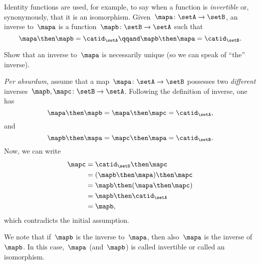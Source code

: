 Identity functions are used, for example, to say when a function is \emph{invertible} or, synonymously, that it is an isomorphism.
Given~$\mapa \colon \setA \to \setB$, an inverse to~$\mapa$ is a function~$\mapb \colon \setB \to \setA$ such that
\begin{equation}
    \label{eq:isomorphism-equations}
    \mapa \then \mapb = \catid_\setA
    \qqand
    \mapb \then \mapa = \catid_\setB.
\end{equation}
%

\begin{exercise}
    Show that an inverse to~$\mapa$ is necessarily unique (so we can speak of ``the'' inverse).
\end{exercise}
\begin{solution}
    \emph{Per absurdum}, assume that a map~$\mapa\colon \setA \to \setB$ possesses two \emph{different} inverses~$\mapb,\mapc\colon \setB\to \setA$.
    Following the definition of inverse, one has
    \begin{equation*}
        \mapa \then \mapb=\mapa \then \mapc=\catid_\setA,
    \end{equation*}
    and
    \begin{equation*}
        \mapb \then \mapa=\mapc \then \mapa=\catid_\setB.
    \end{equation*}
    Now, we can write
    \begin{equation*}
        \begin{aligned}
            \mapc & =\catid_\setB \then \mapc \\
                  & =(\mapb \then \mapa)\then \mapc \\
                  & =\mapb\then (\mapa \then \mapc) \\
                  & =\mapb \then \catid_\setA \\
                  & =\mapb,
        \end{aligned}
    \end{equation*}
    which contradicts the initial assumption.
\end{solution}
We note that if~$\mapb$ is the inverse to~$\mapa$, then also~$\mapa$ is the inverse of~$\mapb$.
In this case,~$\mapa$ (and~$\mapb$) is called invertible or called an isomorphism.

